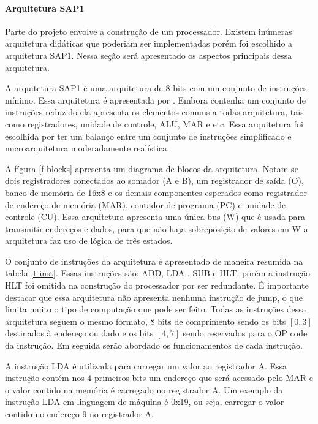 \paragraph{Arquitetura SAP1}
Parte do projeto envolve a construção de um processador.
Existem inúmeras arquitetura didáticas que poderiam ser implementadas porém foi escolhido a arquitetura SAP1.
Nessa seção será apresentado os aspectos principais dessa arquitetura.

A arquitetura SAP1 é uma arquitetura de 8 bits com um conjunto de instruções mínimo.
Essa arquitetura é apresentada por \cite{malvino}.
Embora contenha um conjunto de instruções reduzido ela apresenta os elementos comuns a todas arquitetura, tais como registradores, unidade de controle, ALU, MAR e etc.
Essa arquitetura foi escolhida por ter um balanço entre um conjunto de instruções simplificado e microarquitetura moderadamente realística.

A fígura \ref{f-blocks} apresenta um diagrama de blocos da arquitetura.
Notam-se dois registradores conectados ao somador (A e B), um registrador de saída (O), banco de memória de 16x8 e os demais componentes esperados como registrador de endereço de memória (MAR), contador de programa (PC) e unidade de controle (CU).
Essa arquitetura apresenta uma única bus (W) que é usada para transmitir endereços e dados, para que não haja sobreposição de valores em W a arquitetura faz uso de lógica de três estados.

\figblocks

O conjunto de instruções da arquitetura é apresentado de maneira resumida na tabela \ref{t-inst}.
Essas instruções são: ADD, LDA , SUB e HLT, porém a instrução HLT foi omitida na construção do processador por ser redundante.
É importante destacar que essa arquitetura não apresenta nenhuma instrução de jump, o que limita muito o tipo de computação que pode ser feito.
Todas as instruções dessa arquitetura seguem o mesmo formato, 8 bits de comprimento sendo os bits $[0,3]$ destinados à endereço ou dado e os bits $[4,7]$ sendo reservados para o OP code da instrução.
Em seguida serão abordado os funcionamentos de cada instrução.



A instrução LDA é utilizada para carregar um valor ao registrador A.
Essa instrução contém nos 4 primeiros bits um endereço que será acessado pelo MAR e o valor contido na memória é carregado no registrador A.
Um exemplo da instrução LDA em linguagem de máquina é 0x19, ou seja, carregar o valor contido no endereço 9 no registrador A.

